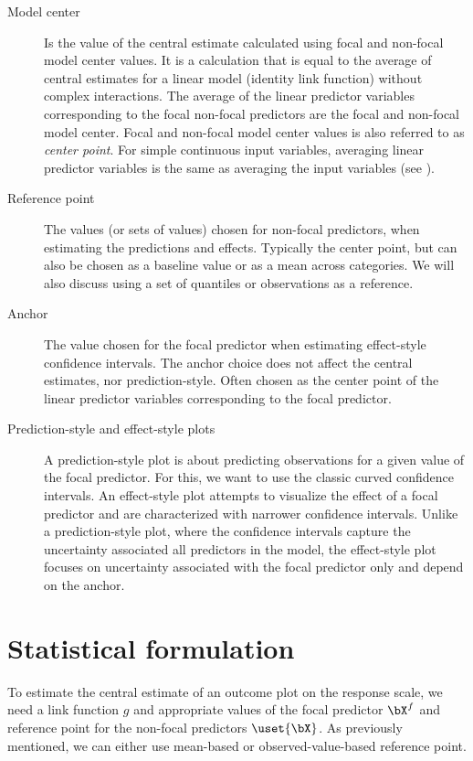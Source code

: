 \begin{description}
\item [Model center] Is the value of the central estimate calculated using focal and non-focal model center values. It is a calculation that is equal to the average of central estimates for a linear model (identity link function) without complex interactions. The average of the linear predictor variables corresponding to the focal non-focal predictors are the focal and non-focal model center. Focal and non-focal model center values is also referred to as \emph{center point}. For simple continuous input variables, averaging linear predictor variables is the same as averaging the input variables (see ).

\item [Reference point] The values (or sets of values) chosen for non-focal predictors, when estimating the predictions and effects. Typically the center point, but can also be chosen as a baseline value or as a mean across categories. We will also discuss using a set of quantiles or observations as a reference.

\item [Anchor] The value chosen for the focal predictor when estimating effect-style confidence intervals. The anchor choice does not affect the central estimates, nor prediction-style. Often chosen as the center point of the linear predictor variables corresponding to the focal predictor. 

\item [Prediction-style and effect-style plots] A prediction-style plot is about predicting observations for a given value of the focal predictor. For this, we want to use the classic curved confidence intervals. An effect-style plot attempts to visualize the effect of a focal predictor and are characterized with narrower confidence intervals. Unlike a prediction-style plot, where the confidence intervals capture the uncertainty associated all predictors in the model, the effect-style plot focuses on uncertainty associated with the focal predictor only and depend on the anchor.

\end{description}

\section{Statistical formulation}

To estimate the central estimate of an outcome plot on the response scale, we need a link function $g$ and appropriate values of the focal predictor $\bX^{f}$ and reference point for the non-focal predictors $\uset{{\bX}}$. As previously mentioned, we can either use mean-based or observed-value-based reference point. 


